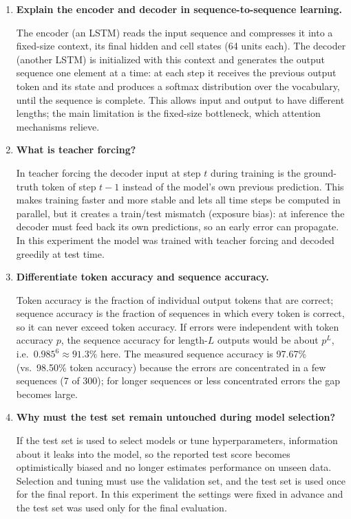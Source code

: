 \documentclass[10pt]{article}
\begin{document}
\begin{enumerate}[itemsep=6pt,topsep=3pt]
\item \textbf{Explain the encoder and decoder in sequence-to-sequence learning.}\par\smallskip
The encoder (an LSTM) reads the input sequence and compresses it into a fixed-size context, its final hidden and cell states (64 units each). The decoder (another LSTM) is initialized with this context and generates the output sequence one element at a time: at each step it receives the previous output token and its state and produces a softmax distribution over the vocabulary, until the sequence is complete. This allows input and output to have different lengths; the main limitation is the fixed-size bottleneck, which attention mechanisms relieve.

\item \textbf{What is teacher forcing?}\par\smallskip
In teacher forcing the decoder input at step $t$ during training is the ground-truth token of step $t-1$ instead of the model's own previous prediction. This makes training faster and more stable and lets all time steps be computed in parallel, but it creates a train/test mismatch (exposure bias): at inference the decoder must feed back its own predictions, so an early error can propagate. In this experiment the model was trained with teacher forcing and decoded greedily at test time.

\item \textbf{Differentiate token accuracy and sequence accuracy.}\par\smallskip
Token accuracy is the fraction of individual output tokens that are correct; sequence accuracy is the fraction of sequences in which every token is correct, so it can never exceed token accuracy. If errors were independent with token accuracy $p$, the sequence accuracy for length-$L$ outputs would be about $p^{L}$, i.e.\ $0.985^{6}\approx91.3\%$ here. The measured sequence accuracy is 97.67\% (vs.\ 98.50\% token accuracy) because the errors are concentrated in a few sequences (7 of 300); for longer sequences or less concentrated errors the gap becomes large.

\item \textbf{Why must the test set remain untouched during model selection?}\par\smallskip
If the test set is used to select models or tune hyperparameters, information about it leaks into the model, so the reported test score becomes optimistically biased and no longer estimates performance on unseen data. Selection and tuning must use the validation set, and the test set is used once for the final report. In this experiment the settings were fixed in advance and the test set was used only for the final evaluation.
\end{enumerate}
\end{document}
